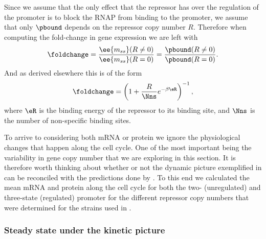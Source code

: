 Since we assume that the only effect that the repressor has over the regulation
of the promoter is to block the RNAP from binding to the promoter, we assume
that only $\pbound$ depends on the repressor copy number $R$. Therefore when
computing the fold-change in gene expression we  are left with
\begin{equation}
  \foldchange = {\ee{m_{ss}}(R \neq 0) \over \ee{m_{ss}}(R = 0)}
              = {\pbound (R \neq 0) \over \pbound (R = 0)}.
\end{equation}
And as derived elsewhere this is of the form \cite{Garcia2011c}
\begin{equation}
  \foldchange = \left(1 + {R \over \Nns}e^{-\beta \eR}  \right)^{-1},
  \label{eq_fold_change_thermo}
\end{equation}
where $\eR$ is the binding energy of the repressor to its binding site, and
$\Nns$ is the number of non-specific binding sites.

To arrive to  considering both mRNA or protein we
ignore the physiological changes that happen along the cell cycle. One of the
most important being the variability in gene copy number that we are exploring
in this section. It is therefore worth thinking about whether or not the dynamic
picture exemplified in  can be reconciled with the
predictions done by . To this end we calculated
the mean mRNA and protein along the cell cycle for both the two- (unregulated)
and three-state (regulated) promoter for the different repressor copy numbers
that were determined for the strains used in \cite{Garcia2011c}.

\subsubsection{Steady state under the kinetic picture}

